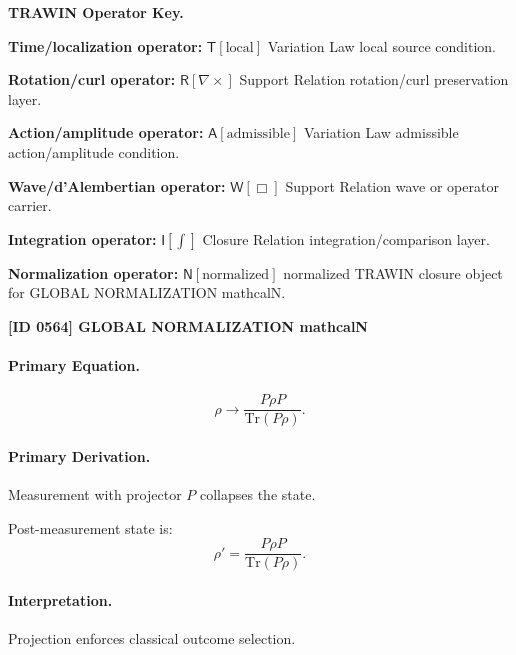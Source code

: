 \par\vspace{0.45\baselineskip}
\noindent\begin{minipage}[t]{\linewidth}
\begingroup
\small
\raggedright
\textbf{TRAWIN Operator Key.}\par
\noindent\textbf{Time/localization operator:} $\mathsf{T}\!\left[\mathrm{local}\right]$ Variation Law local source condition.\par
\noindent\textbf{Rotation/curl operator:} $\mathsf{R}\!\left[\nabla\times\right]$ Support Relation rotation/curl preservation layer.\par
\noindent\textbf{Action/amplitude operator:} $\mathsf{A}\!\left[\mathrm{admissible}\right]$ Variation Law admissible action/amplitude condition.\par
\noindent\textbf{Wave/d'Alembertian operator:} $\mathsf{W}\!\left[\Box\right]$ Support Relation wave or operator carrier.\par
\noindent\textbf{Integration operator:} $\mathsf{I}\!\left[\int\right]$ Closure Relation integration/comparison layer.\par
\noindent\textbf{Normalization operator:} $\mathsf{N}\!\left[\mathrm{normalized}\right]$ normalized TRAWIN closure object for GLOBAL NORMALIZATION mathcalN.\par
\endgroup
\end{minipage}

\clearpage
\noindent\textbf{[ID 0564] GLOBAL NORMALIZATION mathcalN}\par
\vspace{0.35em}
\paragraph{Primary Equation.}
\begin{equation}
\rho \rightarrow \frac{P \rho P}{\mathrm{Tr}(P\rho)}.
\end{equation}

\paragraph{Primary Derivation.}
Measurement with projector $P$ collapses the state.

Post-measurement state is:
\begin{equation}
\rho' = \frac{P \rho P}{\mathrm{Tr}(P\rho)}.
\end{equation}

\paragraph{Interpretation.}
Projection enforces classical outcome selection.

